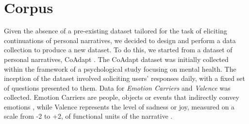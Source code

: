 
\section{Corpus}
Given the absence of a pre-existing dataset tailored for the task of eliciting continuations of personal narratives, we decided to design and perform a data collection to produce a new dataset. To do this, we started from a dataset of personal narratives, CoAdapt \cite{coadapt}. The CoAdapt dataset was initially collected within the framework of a psychological study focusing on mental health. The inception of the dataset involved soliciting users' responses daily, with a fixed set of questions presented to them. Data for \emph{Emotion Carriers} and \emph{Valence} was collected. Emotion Carriers are people, objects or events that indirectly convey emotions \cite{tammewarannotation}, while Valence represents the level of sadness or joy, measured on a scale from -2 to +2, of functional units of the narrative \cite{Ong2021-yt,roccabruna-etal-2022-multi}. 


